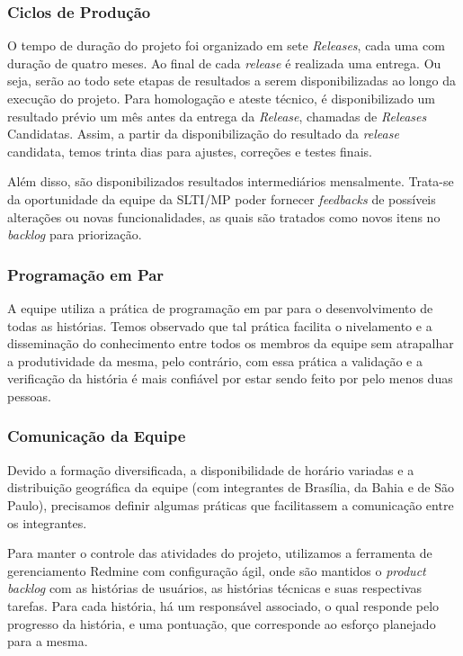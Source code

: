 \subsubsection{Ciclos de Produção}

O tempo de duração do projeto foi organizado em sete \textit{Releases}, cada uma com duração de quatro meses. Ao final de cada \textit{release} é realizada uma entrega. Ou seja, serão ao todo sete etapas de resultados a serem disponibilizadas ao longo da execução do projeto.
Para homologação e ateste técnico, é disponibilizado um resultado prévio um mês antes da entrega da \textit{Release}, chamadas de \textit{Releases} Candidatas. Assim, a partir da disponibilização do resultado da \textit{release} candidata, temos trinta dias para ajustes, correções e testes finais. 

Além disso, são disponibilizados resultados intermediários mensalmente. Trata-se da oportunidade da equipe da SLTI/MP poder fornecer \textit{feedbacks} de possíveis alterações ou novas funcionalidades, as quais são tratados como novos itens no \textit{backlog} para priorização.


\subsubsection{Programação em Par}

A equipe utiliza a prática de programação em par para o desenvolvimento de todas as histórias. Temos observado que tal prática facilita o nivelamento e a disseminação do conhecimento entre todos os membros da equipe sem atrapalhar a produtividade da mesma, pelo contrário, com essa prática a validação e a verificação da história é mais confiável por estar sendo feito por pelo menos duas pessoas.


\subsubsection{Comunicação da Equipe}

Devido a formação diversificada, a disponibilidade de horário variadas e a distribuição geográfica da equipe (com integrantes de Brasília, da Bahia e de São Paulo), precisamos definir algumas práticas que facilitassem a comunicação entre os integrantes. 

Para manter o controle das atividades do projeto, utilizamos a ferramenta de gerenciamento Redmine com configuração ágil, onde são mantidos o \textit{product backlog} com as histórias de usuários, as histórias técnicas e suas respectivas tarefas. Para cada história, há um responsável associado, o qual responde pelo progresso da história, e uma pontuação, que corresponde ao esforço planejado para a mesma.


